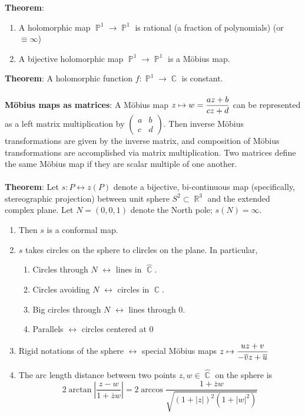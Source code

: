 \documentclass{article}
\DeclareMathOperator{\R}{\mathbb{R}}
\DeclareMathOperator{\C}{\mathbb{C}}
\DeclareMathOperator{\PP}{\mathbb{P}}
\begin{document}
\textbf{Theorem}: \begin{enumerate}
    \item A holomorphic map $\PP^1 \rightarrow \PP^1$ is rational (a fraction of polynomials) (or $\equiv \infty$)
    \item A bijective holomorphic map $\PP^1 \rightarrow \PP^1$ is a Möbius map.
\end{enumerate} $ $ \\
\textbf{Theorem}: A holomorphic function $f: \PP^1 \rightarrow \C$ is constant. \\ \\
\textbf{Möbius maps as matrices}: A Möbius map $z \mapsto w = \mathlarger{\frac{az + b}{cz + d}}$ can be represented as a left matrix multiplication by $\begin{pmatrix}
    a & b \\
    c & d
\end{pmatrix}$. Then inverse Möbius transformations are given by the inverse matrix, and composition of Möbius transformations are accomplished via matrix multiplication. Two matrices define the same Möbius map if they are scalar multiple of one another. \\ \\
\textbf{Theorem}: Let $s: P \leftrightarrow z(P)$ denote a bijective, bi-continuous map (specifically, stereographic projection) between unit sphere $S^2 \subset \R^3$ and the extended complex plane. Let $N = (0, 0, 1)$ denote the North pole; $s(N) = \infty$. \begin{enumerate}
    \item Then $s$ is a conformal map.
    \item $s$ takes circles on the sphere to clircles on the plane. In particular, \begin{enumerate}
        \item Circles through $N$ $\leftrightarrow$ lines in $\hat{\C}$.
        \item Circles avoiding $N$ $\leftrightarrow$ circles in $\C$.
        \item Big circles through $N$ $\leftrightarrow$ lines through 0.
        \item Parallels $\leftrightarrow$ circles centered at 0
    \end{enumerate}
    \item Rigid notations of the sphere $\leftrightarrow$ special Möbius maps $z \mapsto \mathlarger{\frac{uz + v}{-\overline{v}z + \overline{u}}}$
    \item The arc length distance between two points $z, w \in \hat{\C}$ on the sphere is $$2\arctan \left| \frac{z - w}{1 + \overline{z}w} \right| = 2\arccos \frac{1 + \overline{z}w}{\sqrt{(1 + |z|)^2(1 + |w|^2)}}$$
\end{enumerate} $ $ \\
\end{document}
